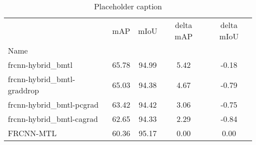 \begin{table}[htbp]
\centering
\caption{Placeholder caption}
\label{tab:bmtl-grad}
\begin{tabular}{lcccc}
\toprule
 & mAP & mIoU & delta mAP & delta mIoU \\
Name &  &  &  &  \\
\midrule
frcnn-hybrid_bmtl & 65.78 & 94.99 & 5.42 & -0.18 \\
frcnn-hybrid_bmtl-graddrop & 65.03 & 94.38 & 4.67 & -0.79 \\
frcnn-hybrid_bmtl-pcgrad & 63.42 & 94.42 & 3.06 & -0.75 \\
frcnn-hybrid_bmtl-cagrad & 62.65 & 94.33 & 2.29 & -0.84 \\
FRCNN-MTL & 60.36 & 95.17 & 0.00 & 0.00 \\
\bottomrule
\end{tabular}
\end{table}
